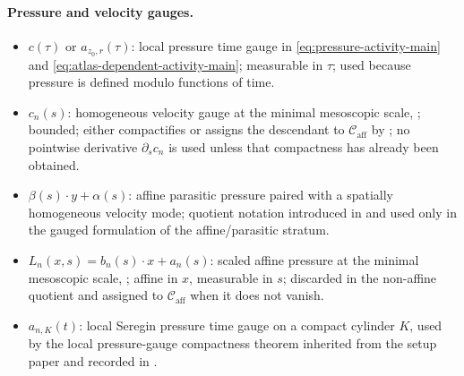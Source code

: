 \documentclass[11pt]{amsart}
\numberwithin{equation}{section}
\theoremstyle{plain}
\theoremstyle{definition}
\theoremstyle{remark}
\newcommand{\Caff}{\mathcal C_{\mathrm{aff}}}
\begin{document}
\paragraph{Pressure and velocity gauges.}
\begin{itemize}[leftmargin=1.6em]
   \item \(c(\tau)\) or \(a_{z_0,r}(\tau)\): local pressure time gauge in
      \eqref{eq:pressure-activity-main} and
      \eqref{eq:atlas-dependent-activity-main};
      measurable in \(\tau\); used because pressure is defined modulo functions
      of time.
   \item \(c_n(s)\): homogeneous velocity gauge at the minimal mesoscopic
      scale, ; bounded; either compactifies
      or assigns the descendant to \(\Caff\) by
      ; no pointwise derivative
      \(\partial_s c_n\) is used unless that compactness has already been
      obtained.
   \item \(\beta(s)\cdot y+\alpha(s)\): affine parasitic pressure paired with a
      spatially homogeneous velocity mode; quotient notation introduced in
       and used only in the gauged
      formulation of the affine/parasitic stratum.
   \item \(L_n(x,s)=b_n(s)\cdot x+a_n(s)\): scaled affine pressure at the
      minimal mesoscopic scale, ;
      affine in \(x\), measurable in \(s\); discarded in the non-affine quotient
      and assigned to \(\Caff\) when it does not vanish.
   \item \(a_{n,K}(t)\): local Seregin pressure time gauge on a compact
      cylinder \(K\), used by the local pressure-gauge compactness theorem
      inherited from the setup paper and recorded in
      .
\end{itemize}
\end{document}
